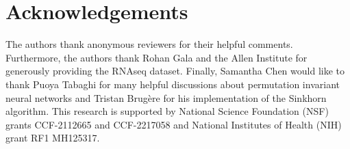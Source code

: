 \documentclass[12pt]{article}
\begin{document}

\section{Acknowledgements}
The authors thank anonymous reviewers for their helpful comments.
Furthermore, the authors thank Rohan Gala and the Allen Institute for generously providing the RNAseq dataset. 
Finally, Samantha Chen would like to thank Puoya Tabaghi for many helpful discussions about permutation invariant neural networks and Tristan Brug\`ere for his implementation of the Sinkhorn algorithm. 
This research is supported by National Science Foundation (NSF) grants CCF-2112665 and CCF-2217058 and National Institutes of Health (NIH) grant RF1 MH125317.



\newpage

\appendix
\end{document}
